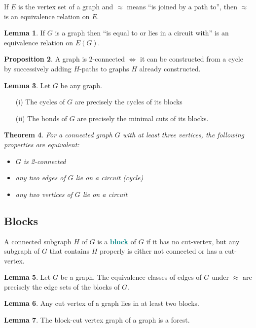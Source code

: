 \documentclass[12pt]{article}
\theoremstyle{plain}
\newtheorem{theorem}{Theorem}[subsection]
\theoremstyle{definition}
\newtheorem{proposition}[theorem]{Proposition}
\newtheorem{lemma}[theorem]{Lemma}
\newcommand{\defnterm}[1]{\textbf{\textcolor{teal}{#1}}\index{#1}}
\begin{document}
If $E$ is the vertex set of a graph and $\approx$ means ``is joined by a path to'', then $\approx$ is an equivalence relation on $E$.

\begin{lemma}
  If $G$ is a graph then ``is equal to or lies in a circuit with'' is an equivalence relation on $E(G)$.
\end{lemma}

\begin{proposition}
  A graph is 2-connected $\iff$ it can be constructed from a cycle by successively adding $H$-paths to graphs $H$ already constructed.
\end{proposition}

\begin{lemma}
  Let $G$ be any graph.
  \begin{enumerate}
    \item[(i)] The cycles of $G$ are precisely the cycles of its blocks
    \item[(ii)] The bonds of $G$ are precisely the minimal cuts of its blocks.
  \end{enumerate}
\end{lemma}

\begin{theorem}
  For a connected graph $G$ with at least three vertices, the following properties are equivalent:
  \begin{itemize}
    \item $G$ is 2-connected
    \item any two edges of $G$ lie on a circuit (cycle)
    \item any two vertices of $G$ lie on a circuit
  \end{itemize}
\end{theorem}

\subsection{Blocks}
A connected subgraph $H$ of $G$ is a \defnterm{block} of $G$ if it has no cut-vertex, but any subgraph of $G$ that contains $H$ properly is either not connected or has a cut-vertex.

\begin{lemma}
  Let $G$ be a graph. The equivalence classes of edges of $G$ under $\approx$ are precisely the edge sets of the blocks of $G$.
\end{lemma}

\begin{lemma}
  Any cut vertex of a graph lies in at least two blocks.
\end{lemma}

\begin{lemma}
  The block-cut vertex graph of a graph is a forest.
\end{lemma}

\clearpage
\printindex
\end{document}
